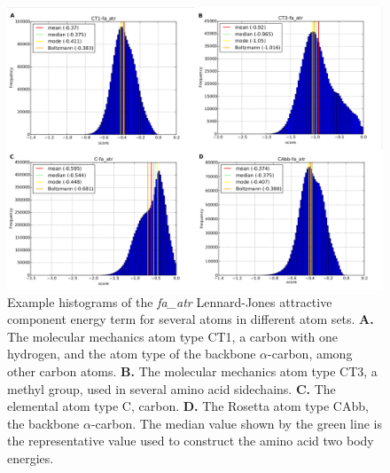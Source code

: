 \begin{figure}
  \includegraphics[width=\linewidth]{Figures/atom_energy_distribution_examples.pdf}
  \caption{Example histograms of the \textit{fa\_atr} Lennard-Jones attractive component energy term for several atoms in different atom sets.
    \textbf{A.} The molecular mechanics atom type CT1, a carbon with one hydrogen, and the atom type of the backbone $\alpha$-carbon, among other carbon atoms.
    \textbf{B.} The molecular mechanics atom type CT3, a methyl group, used in several amino acid sidechains.
    \textbf{C.} The elemental atom type C, carbon.
    \textbf{D.} The Rosetta atom type CAbb, the backbone $\alpha$-carbon.
    The median value shown by the green line is the representative value used to construct the amino acid two body energies.}
  \label{fig:tbaedist}
\end{figure}



